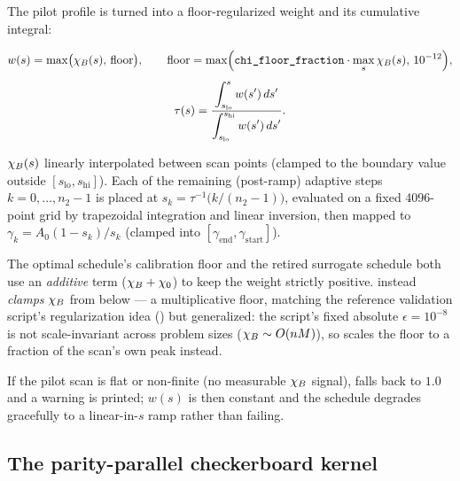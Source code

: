 The pilot profile is turned into a floor-regularized weight and its
cumulative integral:
\begin{keyeq}
\begin{gather}
w(s)=\max\bigl(\chiB(s),\,\text{floor}\bigr),
\qquad
\text{floor}=\max\Bigl(\code{chi\_floor\_fraction}\cdot\max_s\chiB(s),\,
10^{-12}\Bigr),
\label{eq:sqa-chi-weight}\\[4pt]
\tau(s)=\frac{\displaystyle\int_{s_{\mathrm{lo}}}^{s}w(s')\,ds'}
             {\displaystyle\int_{s_{\mathrm{lo}}}^{s_{\mathrm{hi}}}w(s')\,ds'} .
\end{gather}
\end{keyeq}
$\chi_B(s)$ linearly interpolated between scan points (clamped to the
boundary value outside $[s_{\mathrm{lo}},s_{\mathrm{hi}}]$). Each of the
remaining (post-ramp) adaptive steps $k=0,\dots,n_2-1$ is placed at
$s_k=\tau^{-1}\!\bigl(k/(n_2-1)\bigr)$, evaluated on a fixed 4096-point grid
by trapezoidal integration and linear inversion, then mapped to
$\gamma_k=A_0(1-s_k)/s_k$ (clamped into
$[\gamma_{\mathrm{end}},\gamma_{\mathrm{start}}]$).

\begin{notebox}
The optimal schedule's calibration floor and the retired surrogate
schedule both use an \emph{additive} term ($\chi_B+\chi_0$) to keep the
weight strictly positive.  instead \emph{clamps}
$\chi_B$ from below --- a multiplicative floor, matching the reference
validation script's regularization idea ()
but generalized: the script's fixed absolute $\epsilon=10^{-8}$ is not
scale-invariant across problem sizes ($\chi_B\sim O(nM)$), so \qv{} scales
the floor to a fraction of the scan's own peak instead.
\end{notebox}

\begin{notebox}
If the pilot scan is flat or non-finite (no measurable $\chi_B$ signal),
 falls back to $1.0$ and a  warning is printed;
$w(s)$ is then constant and the schedule degrades gracefully to a
linear-in-$s$ ramp rather than failing.
\end{notebox}

\subsection{The parity-parallel checkerboard kernel}
\label{sec:sqa-chi-kernel}

